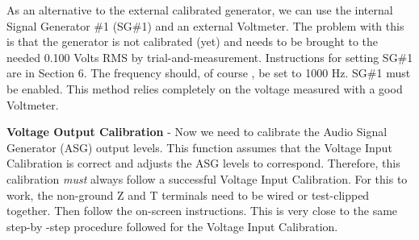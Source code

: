 As an alternative to the external calibrated generator,  we can use the internal Signal Generator \#1 (SG\#1) and an external Voltmeter.  The problem with this is that the generator is not calibrated (yet) and needs to be brought to the needed 0.100 Volts RMS by trial-and-measurement.  Instructions for setting SG\#1 are in Section 6.  The frequency should, of course , be set to 1000 Hz.  SG\#1 must be enabled.   This method relies completely on the voltage measured with a good Voltmeter.

\textbf{Voltage Output Calibration} - Now we need to calibrate the Audio Signal Generator (ASG) output levels.  This function assumes that the Voltage Input Calibration is correct and adjusts the ASG levels to correspond.  Therefore, this calibration \textit{must} always follow a successful Voltage Input Calibration.  For this to work, the non-ground Z and T terminals need to be wired  or test-clipped together.  Then follow the on-screen instructions.  This is very close to the same step-by -step procedure followed for the Voltage Input Calibration. 

